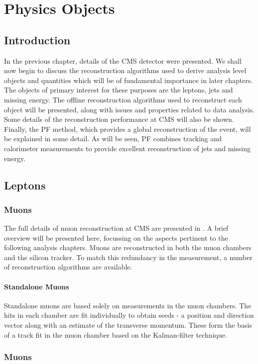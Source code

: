 \chapter{Physics Objects}
\section{Introduction}
In the previous chapter, details of the \ac{CMS} detector were presented. We
shall now begin to discuss the reconstruction algorithms used to derive analysis
level objects and quantities which will be of fundamental importance in later
chapters. The objects of primary interest for these purposes are the leptons,
jets and missing energy. The offline reconstruction algorithms used to
reconstruct each object will be presented, along with issues and properties
related to data analysis. Some details of the reconstruction performance at
\ac{CMS} will also be shown. Finally, the \acl{PF} method, which provides a
global reconstruction of the event, will be explained in some detail. As will be
seen, \ac{PF} combines tracking and calorimeter measurements to provide
excellent reconstruction of jets and missing energy.

\section{Leptons}
\subsection{Muons}
The full details of muon reconstruction at CMS are presented in
\cite{cms_mu_reco}. A brief overview will be presented here, focussing on the
aspects pertinent to the following analysis chapters. Muons are reconstructed in
both the muon chambers and the silicon tracker. To match this redundancy in the
measurement, a number of reconstruction algorithms are available.

\subsubsection{Standalone Muons}
Standalone muons are based solely on measurements in the muon chambers. The hits
in each chamber are fit individually to obtain seeds - a position and direction
vector along with an estimate of the transverse momentum. These form the basis
of a track fit in the muon chamber based on the Kalman-filter technique.
\subsection{Muons}
